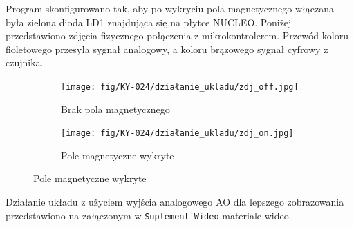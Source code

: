 \documentclass[11pt, a4paper]{article}
\begin{document}
Program skonfigurowano tak, aby po wykryciu pola magnetycznego włączana była zielona dioda LD1 znajdująca się na płytce NUCLEO. Poniżej przedstawiono zdjęcia fizycznego połączenia z mikrokontrolerem. Przewód koloru fioletowego przesyła sygnał analogowy, a koloru brązowego sygnał cyfrowy z czujnika.
\vspace{0.25cm}
\begin{figure}[H]
\centering
\begin{subfigure}{.5\textwidth}
\centering
\texttt{[image: fig/KY-024/działanie\_ukladu/zdj\_off.jpg]}
\caption{Brak pola magnetycznego}
\label{fig:_uklad_off}
\end{subfigure}%
\begin{subfigure}{.5\textwidth}
\centering
\texttt{[image: fig/KY-024/działanie\_ukladu/zdj\_on.jpg]}
\caption{Pole magnetyczne wykryte}
\label{fig:_uklad_on}
\end{subfigure}
\label{fig:mikroproc}
\end{figure}
\vspace{0.25cm}
Działanie układu z użyciem wyjścia analogowego AO dla lepszego zobrazowania przedstawiono na załączonym w \texttt{Suplement Wideo} materiale wideo.

\newpage
\printbibliography[heading=bibintoc]
\end{document}
